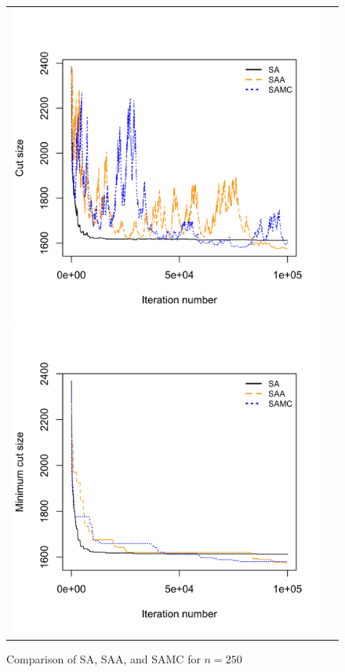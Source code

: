 \documentclass[11pt,]{article}
\begin{document}
\begin{figure}[hbpt]
  \begin{tabular}{cc}
    \includegraphics[width=.5\textwidth]{images/graph_cut_n250_iter1e+05}
    \includegraphics[width=.5\textwidth]{images/graph_min_cut_n250_iter1e+05}
  \end{tabular}
  \caption{Comparison of SA, SAA, and SAMC for $n = 250$}
  \label{fig:n250}
\end{figure}
\end{document}

